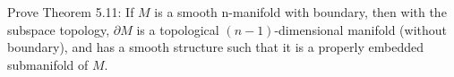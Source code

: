 Prove Theorem 5.11: If $M$ is a smooth n-manifold with boundary, then with the subspace topology, $\partial M$ is a topological $(n-1)$-dimensional manifold (without boundary), and has a smooth structure such that it is a properly embedded submanifold of $M$.